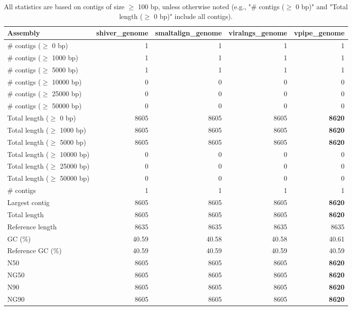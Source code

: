 \documentclass[12pt,a4paper]{article}
\begin{document}
\begin{table}[ht]
\begin{center}
\caption{All statistics are based on contigs of size $\geq$ 100 bp, unless otherwise noted (e.g., "\# contigs ($\geq$ 0 bp)" and "Total length ($\geq$ 0 bp)" include all contigs).}
\begin{tabular}{|l*{4}{|r}|}
\hline
Assembly & shiver\_genome & smaltalign\_genome & viralngs\_genome & vpipe\_genome \\ \hline
\# contigs ($\geq$ 0 bp) & 1 & 1 & 1 & 1 \\ \hline
\# contigs ($\geq$ 1000 bp) & 1 & 1 & 1 & 1 \\ \hline
\# contigs ($\geq$ 5000 bp) & 1 & 1 & 1 & 1 \\ \hline
\# contigs ($\geq$ 10000 bp) & 0 & 0 & 0 & 0 \\ \hline
\# contigs ($\geq$ 25000 bp) & 0 & 0 & 0 & 0 \\ \hline
\# contigs ($\geq$ 50000 bp) & 0 & 0 & 0 & 0 \\ \hline
Total length ($\geq$ 0 bp) & 8605 & 8605 & 8605 & {\bf 8620} \\ \hline
Total length ($\geq$ 1000 bp) & 8605 & 8605 & 8605 & {\bf 8620} \\ \hline
Total length ($\geq$ 5000 bp) & 8605 & 8605 & 8605 & {\bf 8620} \\ \hline
Total length ($\geq$ 10000 bp) & 0 & 0 & 0 & 0 \\ \hline
Total length ($\geq$ 25000 bp) & 0 & 0 & 0 & 0 \\ \hline
Total length ($\geq$ 50000 bp) & 0 & 0 & 0 & 0 \\ \hline
\# contigs & 1 & 1 & 1 & 1 \\ \hline
Largest contig & 8605 & 8605 & 8605 & {\bf 8620} \\ \hline
Total length & 8605 & 8605 & 8605 & {\bf 8620} \\ \hline
Reference length & 8635 & 8635 & 8635 & 8635 \\ \hline
GC (\%) & 40.59 & 40.58 & 40.58 & 40.61 \\ \hline
Reference GC (\%) & 40.59 & 40.59 & 40.59 & 40.59 \\ \hline
N50 & 8605 & 8605 & 8605 & {\bf 8620} \\ \hline
NG50 & 8605 & 8605 & 8605 & {\bf 8620} \\ \hline
N90 & 8605 & 8605 & 8605 & {\bf 8620} \\ \hline
NG90 & 8605 & 8605 & 8605 & {\bf 8620} \\ \hline

\end{tabular}
\end{center}
\end{table}
\end{document}
